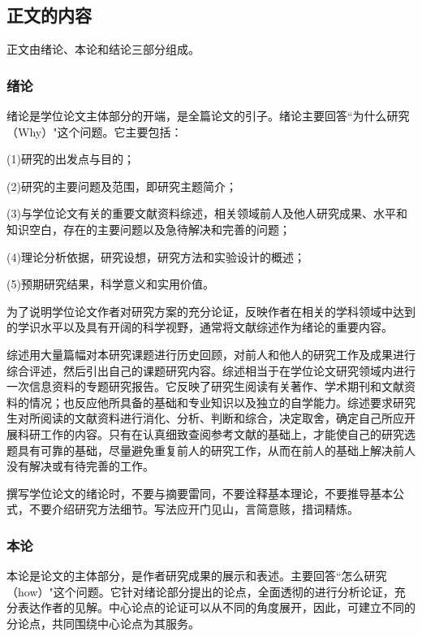 \subsection{正文的内容}\label{appendixA-6-1}

正文由绪论、本论和结论三部分组成。

\subsubsection{绪论}\label{appendixA-6-1-1}

绪论是学位论文主体部分的开端，是全篇论文的引子。绪论主要回答``为什么研究（Why）"这个问题。它主要包括：

(1)研究的出发点与目的；

(2)研究的主要问题及范围，即研究主题简介；

(3)与学位论文有关的重要文献资料综述，相关领域前人及他人研究成果、水平和知识空白，存在的主要问题以及急待解决和完善的问题；

(4)理论分析依据，研究设想，研究方法和实验设计的概述；

(5)预期研究结果，科学意义和实用价值。

为了说明学位论文作者对研究方案的充分论证，反映作者在相关的学科领域中达到的学识水平以及具有开阔的科学视野，通常将文献综述作为绪论的重要内容。

综述用大量篇幅对本研究课题进行历史回顾，对前人和他人的研究工作及成果进行综合评述，然后引出自己的课题研究内容。综述相当于在学位论文研究领域内进行一次信息资料的专题研究报告。它反映了研究生阅读有关著作、学术期刊和文献资料的情况；也反应他所具备的基础和专业知识以及独立的自学能力。综述要求研究生对所阅读的文献资料进行消化、分析、判断和综合，决定取舍，确定自己所应开展科研工作的内容。只有在认真细致查阅参考文献的基础上，才能使自己的研究选题具有可靠的基础，尽量避免重复前人的研究工作，从而在前人的基础上解决前人没有解决或有待完善的工作。

撰写学位论文的绪论时，不要与摘要雷同，不要诠释基本理论，不要推导基本公式，不要介绍研究方法细节。写法应开门见山，言简意赅，措词精炼。

\subsubsection{本论}\label{appendixA-6-1-2}
本论是论文的主体部分，是作者研究成果的展示和表述。主要回答``怎么研究（how）"这个问题。它针对绪论部分提出的论点，全面透彻的进行分析论证，充分表达作者的见解。中心论点的论证可以从不同的角度展开，因此，可建立不同的分论点，共同围绕中心论点为其服务。

